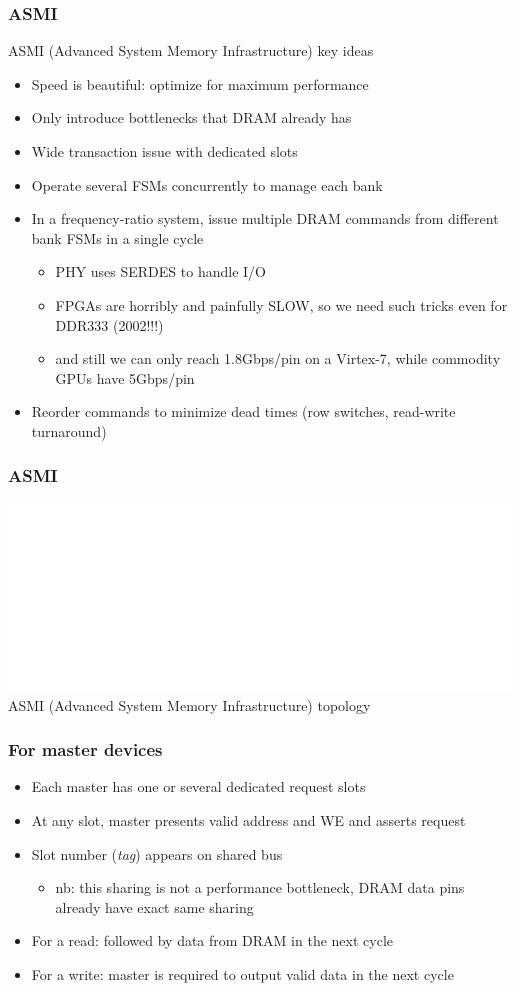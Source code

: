 \documentclass[serif,mathserif]{beamer}
\begin{document}
\ifdefined\SHORTPRES
\begin{frame}
\frametitle{ASMI}
ASMI (Advanced System Memory Infrastructure) key ideas
\begin{itemize}
\item Speed is beautiful: optimize for maximum performance
\item Only introduce bottlenecks that DRAM already has
\item Wide transaction issue with dedicated slots
\item Operate several FSMs concurrently to manage each bank
\item In a frequency-ratio system, issue multiple DRAM commands from different bank FSMs in a single cycle
\begin{itemize}
\item PHY uses SERDES to handle I/O
\item FPGAs are horribly and painfully SLOW, so we need such tricks even for DDR333 (2002!!!)
\item and still we can only reach 1.8Gbps/pin on a Virtex-7, while commodity GPUs have 5Gbps/pin
\end{itemize}
\item Reorder commands to minimize dead times (row switches, read-write turnaround)
\end{itemize}
\end{frame}
\else
\begin{frame}
\frametitle{ASMI}
\includegraphics[width=\textwidth]{asmi_topology.png} \\
ASMI (Advanced System Memory Infrastructure) topology
\end{frame}

\begin{frame}
\frametitle{For master devices}
\begin{itemize}
\item Each master has one or several dedicated request slots
\item At any slot, master presents valid address and WE and asserts request
\item Slot number (\textit{tag}) appears on shared bus
\begin{itemize}
\item nb: this sharing is not a performance bottleneck, DRAM data pins already have exact same sharing
\end{itemize}
\item For a read: followed by data from DRAM in the next cycle
\item For a write: master is required to output valid data in the next cycle
\end{itemize}
\end{frame}
\end{document}
